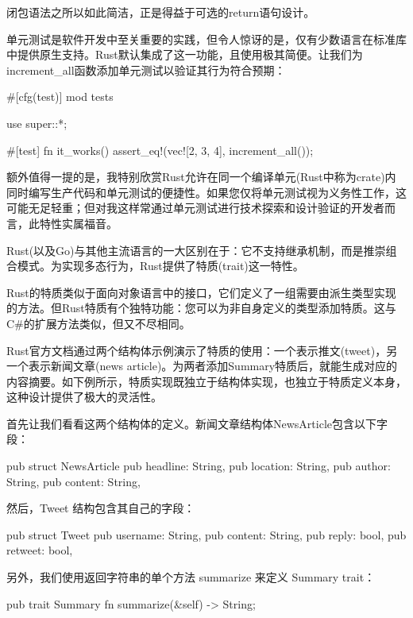 闭包语法之所以如此简洁，正是得益于可选的return语句设计。


单元测试是软件开发中至关重要的实践，但令人惊讶的是，仅有少数语言在标准库中提供原生支持。Rust默认集成了这一功能，且使用极其简便。让我们为increment\_all函数添加单元测试以验证其行为符合预期：

\begin{rust}
#[cfg(test)]
mod tests {
  use super::*;

  #[test]
  fn it_works() {
    assert_eq!(vec![2, 3, 4], increment_all());
  }
}
\end{rust}

额外值得一提的是，我特别欣赏Rust允许在同一个编译单元(Rust中称为crate)内同时编写生产代码和单元测试的便捷性。如果您仅将单元测试视为义务性工作，这可能无足轻重；但对我这样常通过单元测试进行技术探索和设计验证的开发者而言，此特性实属福音。


Rust(以及Go)与其他主流语言的一大区别在于：它不支持继承机制，而是推崇组合模式。为实现多态行为，Rust提供了特质(trait)这一特性。

Rust的特质类似于面向对象语言中的接口，它们定义了一组需要由派生类型实现的方法。但Rust特质有个独特功能：您可以为非自身定义的类型添加特质。这与C\#的扩展方法类似，但又不尽相同。

Rust官方文档通过两个结构体示例演示了特质的使用：一个表示推文(tweet)，另一个表示新闻文章(news article)。为两者添加Summary特质后，就能生成对应的内容摘要。如下例所示，特质实现既独立于结构体实现，也独立于特质定义本身，这种设计提供了极大的灵活性。

首先让我们看看这两个结构体的定义。新闻文章结构体NewsArticle包含以下字段：

\begin{rust}
pub struct NewsArticle {
  pub headline: String,
  pub location: String,
  pub author: String,
  pub content: String,
}
\end{rust}

然后，Tweet 结构包含其自己的字段：

\begin{rust}
pub struct Tweet {
  pub username: String,
  pub content: String,
  pub reply: bool,
  pub retweet: bool,
}
\end{rust}

另外，我们使用返回字符串的单个方法 summarize 来定义 Summary trait：

\begin{rust}
pub trait Summary {
  fn summarize(&self) -> String;
}
\end{rust}

